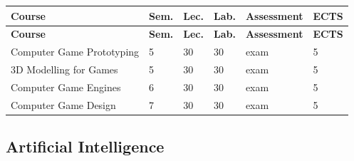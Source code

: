 \documentclass[12pt,a4paper]{article}
\newcommand{\thdrule}{\noalign{\global\setlength{\extrarowheight}{0pt}}}
\newcommand{\thdend}{\noalign{\global\setlength{\extrarowheight}{4pt}}}
\begin{document}
{\scriptsize
\begin{longtable}{m{6.5cm}m{0.7cm}m{1cm}m{1cm}m{1.7cm}m{0.7cm}}
\thdrule\toprule
\rowcolor{pjatkRed}
{\color{white}\footnotesize\textbf{\vphantom{Ag}Course}} & {\color{white}\footnotesize\textbf{\vphantom{Ag}Sem.}} & {\color{white}\footnotesize\textbf{\vphantom{Ag}Lec.}} & {\color{white}\footnotesize\textbf{\vphantom{Ag}Lab.}} & {\color{white}\footnotesize\textbf{\vphantom{Ag}Assessment}} & {\color{white}\footnotesize\textbf{\vphantom{Ag}ECTS}} \\
\midrule\thdend
\endfirsthead
\thdrule\toprule
\rowcolor{pjatkRed}
{\color{white}\footnotesize\textbf{\vphantom{Ag}Course}} & {\color{white}\footnotesize\textbf{\vphantom{Ag}Sem.}} & {\color{white}\footnotesize\textbf{\vphantom{Ag}Lec.}} & {\color{white}\footnotesize\textbf{\vphantom{Ag}Lab.}} & {\color{white}\footnotesize\textbf{\vphantom{Ag}Assessment}} & {\color{white}\footnotesize\textbf{\vphantom{Ag}ECTS}} \\
\midrule\thdend
\endhead
\rowcolor{tableRowLight} Computer Game Prototyping & 5 & 30 & 30 & {\scriptsize exam} & 5 \\
\rowcolor{tableRowAlt} 3D Modelling for Games & 5 & 30 & 30 & {\scriptsize exam} & 5 \\
\rowcolor{tableRowLight} Computer Game Engines & 6 & 30 & 30 & {\scriptsize exam} & 5 \\
\rowcolor{tableRowAlt} Computer Game Design & 7 & 30 & 30 & {\scriptsize exam} & 5 \\
\bottomrule
\end{longtable}}

\subsection*{Artificial Intelligence}
\end{document}

